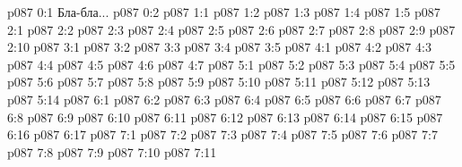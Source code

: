\author{Яркая Вечерняя Звезда}
\vs p087 0:1  Бла-бла...
\vs p087 0:2 
\vs p087 1:1 
\vs p087 1:2 
\vs p087 1:3 
\vs p087 1:4 
\vs p087 1:5 
\vs p087 2:1 
\vs p087 2:2 \pc 
\vs p087 2:3 
\vs p087 2:4 
\vs p087 2:5 
\vs p087 2:6 
\vs p087 2:7 \pc 
\vs p087 2:8 
\vs p087 2:9 
\vs p087 2:10 
\vs p087 3:1 
\vs p087 3:2 
\vs p087 3:3 
\vs p087 3:4 
\vs p087 3:5 \pc 
{}
\vs p087 4:1 
\vs p087 4:2 
\vs p087 4:3 
\vs p087 4:4 
\vs p087 4:5 \pc 
\vs p087 4:6 
\vs p087 4:7 
\vs p087 5:1 
\vs p087 5:2 
\vs p087 5:3 
\vs p087 5:4 
\vs p087 5:5 
\vs p087 5:6 
\vs p087 5:7 
\vs p087 5:8 \pc 
\vs p087 5:9 
\vs p087 5:10 
\vs p087 5:11 
\vs p087 5:12 
\vs p087 5:13 
\vs p087 5:14 \pc 
{}
\vs p087 6:1 
\vs p087 6:2 
\vs p087 6:3 
\vs p087 6:4 
\vs p087 6:5 
\vs p087 6:6 
\vs p087 6:7 
\vs p087 6:8 
\vs p087 6:9 
\vs p087 6:10 
\vs p087 6:11 \pc 
\vs p087 6:12 
\vs p087 6:13 
\vs p087 6:14 
\vs p087 6:15 
\vs p087 6:16 
\vs p087 6:17 \pc 
{}
\vs p087 7:1 
\vs p087 7:2 
\vs p087 7:3 
\vs p087 7:4 
\vs p087 7:5 \pc 
\vs p087 7:6 \pc 
\vs p087 7:7 
\vs p087 7:8 
\vs p087 7:9 
\vs p087 7:10 
\vsetoff
\vs p087 7:11 
\quizlink
